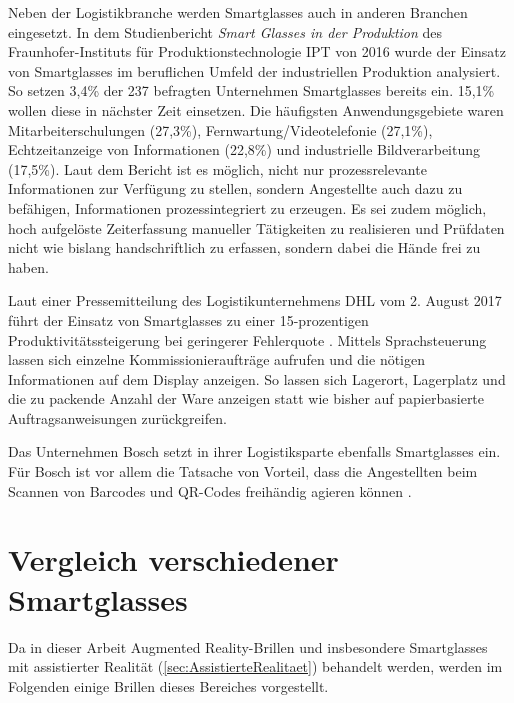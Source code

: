 Neben der Logistikbranche werden Smartglasses auch in anderen Branchen eingesetzt. In dem Studienbericht \emph{Smart Glasses in der Produktion} des Fraunhofer-Instituts für Produktionstechnologie IPT von 2016 \cite{Plutz} wurde der Einsatz von Smartglasses im beruflichen Umfeld der industriellen Produktion analysiert. So setzen 3,4\% der 237 befragten Unternehmen  Smartglasses bereits ein. 15,1\% wollen diese in nächster Zeit einsetzen. Die häufigsten Anwendungsgebiete waren Mitarbeiterschulungen (27,3\%), Fernwartung/Videotelefonie (27,1\%), Echtzeitanzeige von Informationen (22,8\%) und industrielle Bildverarbeitung (17,5\%). Laut dem Bericht ist es möglich, nicht nur 
prozessrelevante Informationen zur Verfügung zu stellen, sondern Angestellte auch dazu zu befähigen, Informationen prozessintegriert zu erzeugen. Es sei zudem möglich, hoch aufgelöste Zeiterfassung manueller Tätigkeiten zu realisieren und Prüfdaten nicht wie bislang handschriftlich zu erfassen, sondern dabei die Hände frei zu haben.

Laut einer Pressemitteilung des Logistikunternehmens DHL vom 2. August 2017 führt der Einsatz von Smartglasses zu einer 15-prozentigen Produktivitätssteigerung bei geringerer Fehlerquote \cite{DeutschePostDHLGroup2017}. Mittels Sprachsteuerung lassen sich einzelne Kommissionieraufträge aufrufen und die nötigen Informationen auf dem Display anzeigen. So lassen sich Lagerort, Lagerplatz und die zu packende Anzahl der Ware anzeigen statt wie bisher auf papierbasierte Auftragsanweisungen zurückgreifen. 

Das Unternehmen Bosch setzt in ihrer Logistiksparte ebenfalls Smartglasses ein. Für Bosch ist vor allem die Tatsache von Vorteil, dass die Angestellten beim Scannen von Barcodes und QR-Codes freihändig agieren können \cite{Spinger2014}. 
%
%
%
%
%
%
\section{Vergleich verschiedener Smartglasses}
\label{sec:VergleichSmartglasses}
Da in dieser Arbeit Augmented Reality-Brillen und insbesondere Smartglasses mit assistierter Realität (\ref{sec:AssistierteRealitaet}) behandelt werden, werden im Folgenden einige Brillen dieses Bereiches vorgestellt.
%
%
%
%
%
%
